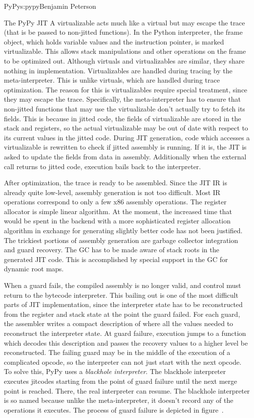 \begin{aosachapter}{PyPy}{s:pypy}{Benjamin Peterson}
\begin{aosasect1}{The PyPy JIT}
A virtualizable acts much like a virtual but may escape the trace (that is be
passed to non-jitted functions). In the Python interpreter, the frame object,
which holds variable values and the instruction pointer, is marked
virtualizable. This allows stack manipulations and other operations on the frame
to be optimized out. Although virtuals and virtualizables are similar, they
share nothing in implementation. Virtualizables are handled during tracing by
the meta-interpreter. This is unlike virtuals, which are handled during trace
optimization. The reason for this is virtualizables require special treatment,
since they may escape the trace. Specifically, the meta-interpreter has to
ensure that non-jitted functions that may use the virtualizable don't actually
try to fetch its fields. This is because in jitted code, the fields of
virtualizable are stored in the stack and registers, so the actual virtualizable
may be out of date with respect to its current values in the jitted code. During
JIT generation, code which accesses a virtualizable is rewritten to check if
jitted assembly is running. If it is, the JIT is asked to update the fields from
data in assembly. Additionally when the external call returns to jitted code,
execution bails back to the interpreter.

After optimization, the trace is ready to be assembled. Since the JIT IR is
already quite low-level, assembly generation is not too difficult. Most IR
operations correspond to only a few x86 assembly operations. The register
allocator is simple linear algorithm. At the moment, the increased time that
would be spent in the backend with a more sophisticated register allocation
algorithm in exchange for generating slightly better code has not been
justified. The trickiest portions of assembly generation are garbage collector
integration and guard recovery. The GC has to be made aware of stack roots in
the generated JIT code. This is accomplished by special support in the GC for
dynamic root maps.

When a guard fails, the compiled assembly is no longer valid, and control must
return to the bytecode interpreter. This bailing out is one of the most
difficult parts of JIT implementation, since the interpreter state has to be
reconstructed from the register and stack state at the point the guard
failed. For each guard, the assembler writes a compact description of where all
the values needed to reconstruct the interpreter state. At guard failure,
execution jumps to a function which decodes this description and passes the
recovery values to a higher level be reconstructed. The failing guard may be in
the middle of the execution of a complicated opcode, so the interpreter can not
just start with the next opcode. To solve this, PyPy uses a \emph{blackhole
  interpreter}. The blackhole interpreter executes jitcodes starting from the
point of guard failure until the next merge point is reached. There, the real
interpreter can resume. The blackhole interpreter is so named because unlike the
meta-interpreter, it doesn't record any of the operations it executes. The
process of guard failure is depicted in figure~.


\end{aosasect1}
\end{aosachapter}
